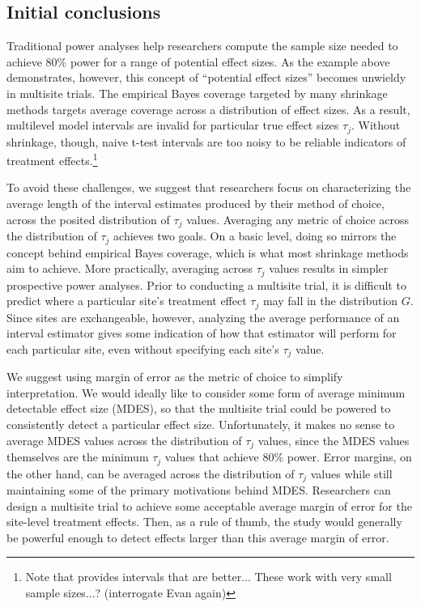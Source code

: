 \documentclass[]{article}
\begin{document}
\subsection{Initial conclusions}

Traditional power analyses help researchers compute the sample size needed to achieve 80\% power for a range of potential effect sizes.
As the example above demonstrates, however, this concept of ``potential effect sizes'' becomes unwieldy in multisite trials.
The empirical Bayes coverage targeted by many shrinkage methods targets average coverage across a distribution of effect sizes.
As a result, multilevel model intervals are invalid for particular true effect sizes $\tau_j$.
Without shrinkage, though, naive t-test intervals are too noisy to be reliable indicators of treatment effects.\footnote{Note that \cite{yu2018adaptive} provides intervals that are better... These work with very small sample sizes...? (interrogate Evan again)}

To avoid these challenges, we suggest that researchers focus on characterizing the average length of the interval estimates produced by their method of choice, across the posited distribution of $\tau_j$ values.
Averaging any metric of choice across the distribution of $\tau_j$ achieves two goals.
On a basic level, doing so mirrors the concept behind empirical Bayes coverage, which is what most shrinkage methods aim to achieve.
More practically, averaging across $\tau_j$ values results in simpler prospective power analyses.
Prior to conducting a multisite trial, it is difficult to predict where a particular site's treatment effect $\tau_j$ may fall in the distribution $G$.
Since sites are exchangeable, however, analyzing the average performance of an interval estimator gives some indication of how that estimator will perform for each particular site, even without specifying each site's $\tau_j$ value.

We suggest using margin of error as the metric of choice to simplify interpretation.
We would ideally like to consider some form of average minimum detectable effect size (MDES), so that the multisite trial could be powered to consistently detect a particular effect size.
Unfortunately, it makes no sense to average MDES values across the distribution of $\tau_j$ values, since the MDES values themselves are the minimum $\tau_j$ values that achieve 80\% power.
Error margins, on the other hand, can be averaged across the distribution of $\tau_j$ values while still maintaining some of the primary motivations behind MDES.
Researchers can design a multisite trial to achieve some acceptable average margin of error for the site-level treatment effects.
Then, as a rule of thumb, the study would generally be powerful enough to detect effects larger than this average margin of error.
\end{document}
